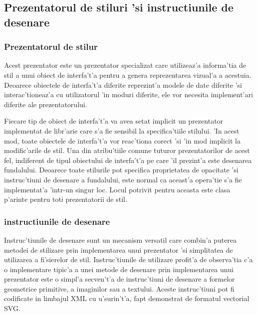 \subsection{Prezentatorul de stiluri 'si instructiunile de desenare}

\subsubsection{Prezentatorul de stilur}

Acest prezentator este un prezentator specializat care utilizeaz'a informa'tia de stil a unui obiect de interfa't'a pentru a genera reprezentarea vizual'a a acestuia. Deoarece obiectele de interfa't'a diferite reprezint'a modele de date diferite 'si interac'tioneaz'a cu utilizatorul 'in moduri diferite, ele vor necesita implement'ari diferite ale prezentatorului.

\medskip

Fiecare tip de obiect de interfa't'a va avea setat implicit un prezentator implementat de libr'arie care s'a fie sensibil la specifica'tiile stilului. 'In acest mod, toate obiectele de interfa't'a vor reac'tiona corect 'si 'in mod implicit la modific'arile de stil. Una din atribu'tiile comune tuturor prezentatorilor de acest fel, indiferent de tipul obiectului de interfa't'a pe care 'il prezint'a este desenarea fundalului. Deoarece toate stilurile pot specifica proprietatea de opacitate 'si instruc'tiuni de desenare a fundalului, este normal ca aceast'a opera'tie s'a fie implementat'a 'intr-un singur loc. Locul potrivit pentru aceasta este clasa p'arinte pentru toti prezentatorii de stil.

\subsubsection{instructiunile de desenare}

Instruc'tiunile de desenare sunt un mecanism versatil care combin'a puterea metodei de stilizare prin implementarea unui prezentator 'si simplitatea de utilizarea a fi'sierelor de stil. Instruc'tiunile de utilizare profit'a de observa'tia c'a o implementare tipic'a a unei metode de desenare prin implementarea unui prezentator este o simpl'a secven't'a de instruc'tiuni de desenare a formelor geometrice primitive, a imaginilor sau a textului. Aceste instruc'tiuni pot fi codificate in limbajul XML cu u'surin't'a, fapt demonstrat de formatul vectorial SVG. 

\medskip

